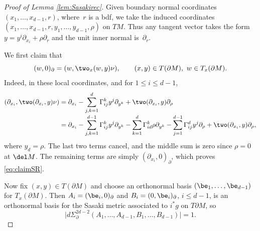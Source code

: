 \begin{proof}[Proof of Lemma \ref{lem:Sasakirec}] Given boundary normal coordinates $(x_1,\dots,x_{d-1},r)$, where~$r$ is a bdf,
we take the induced coordinates $(x_1,\dots,x_{d-1}, r, y_1, \dots, y_{d-1}, \rho)$ on $TM$. Thus any tangent vector takes the
form $y \!=\! y^i \partial_{x_i} \!+\! \rho \partial_r$ and the unit inner normal is~$\partial_r$.

We first claim that\vspace*{-3pt}
\begin{equation}
(w,0)_\partial = (w, \two_x(w,y)\nu), \qquad (x,y)\in T(\partial M),\ w\in T_x(\partial M).
\label{eq:claimSR}
\end{equation}
Indeed, in these local coordinates, and for $1\le i\le d-1$,\vspace*{-3pt}
\begin{align*}
(\partial_{x_i}, \two(\partial_{x_i},y)\nu) &= \partial_{x_i} - \sum_{j,k=1}^d \Gamma_{ij}^k y^j \partial_{y^k} + \two(\partial_{x_i},y) \partial_\rho \\[-2pt]
&= \partial_{x_i} - \sum_{j,k=1}^{d-1} \Gamma_{ij}^k y^j \partial_{y^k} - \sum_{k=1}^{d} \Gamma_{id}^k \rho \partial_{y^k} - \sum_{j=1}^{d-1} \Gamma_{ij}^d y^j \partial_\rho + \two(\partial_{x_i},y) \partial_\rho,
\end{align*}
where $y_d = \rho$. The last two terms cancel, and the middle sum is zero since $\rho=0$ at $\del M$. The remaining terms are simply $(\partial_{x_i},0)_\partial$, which
proves \eqref{eq:claimSR}.

Now fix $(x,y)\in T(\partial M)$ and choose an orthonormal basis $(\be_1, \dots, \be_{d-1})$ for $T_x(\partial M)$.
Then $A_i = (\be_i, 0)_\partial$ and $B_i = (0,\be_i)_\partial$, $i \leq d-1$, is an orthonormal basis for the Sasaki metric associated to
$i^* g$ on $T \partial M$, so
\begin{equation*}
\bigl|d\Sigma_{\partial}^{2d-2}(A_1,\dots,A_{d-1}, B_1, \dots, B_{d-1})\bigr| = 1.
\end{equation*}


\end{proof}
